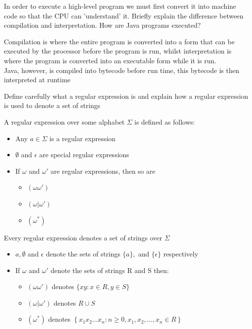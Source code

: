\documentclass[addpoints]{exam}
\begin{document}
\begin{questions}
\question[6]In order to execute a high-level program we must first convert it into machine code so that the CPU can 'understand' it. Briefly explain the difference between compilation and interpretation. How are Java programs executed?
\begin{solution}[2in]
	Compilation is where the entire program is converted into a form that can be executed by the processor before the program is run, whilst interpretation is where the program is converted into an executable form while it is run.\\
	Java, however, is compiled into bytecode before run time, this bytecode is then interpreted at runtime
\end{solution}

\question[14]Define carefully what a regular expression is and explain how a regular expression is used to denote a set of strings
\begin{solution}[2in]
	A regular expression over some alphabet $\Sigma$ is defined as follows:
	\begin{itemize}
		\item Any $a\in \Sigma$ is a regular expression
		\item $\emptyset$ and $\epsilon$ are special regular expressions
		\item If $\omega$ and $\omega'$ are regular expressions, then so are
		\begin{itemize}
			\item $(\omega\omega')$
			\item $(\omega|\omega')$
			\item $(\omega^*)$
		\end{itemize}
	\end{itemize}
	Every regular expression denotes a set of strings over $\Sigma$
	\begin{itemize}
		\item $a,\emptyset$ and $\epsilon$ denote the sets of strings $\{a\},{}$ and $\{\epsilon\}$ respectively
		\item If $\omega$ and $\omega'$ denote the sets of strings R and S then:
		\begin{itemize}
			\item $(\omega\omega')$ denotes \(\{x y : x \in R, y \in S\}\)
			\item $(\omega|\omega')$ denotes $R\cup S$
			\item $(\omega^*)$ denotes \(\left\{x_{1} x_{2} \ldots x_{n} : n \geq 0, x_{1}, x_{2}, \ldots, x_{n} \in R\right\}\)
		\end{itemize}
	\end{itemize}
\end{solution}


\end{questions}
\end{document}
